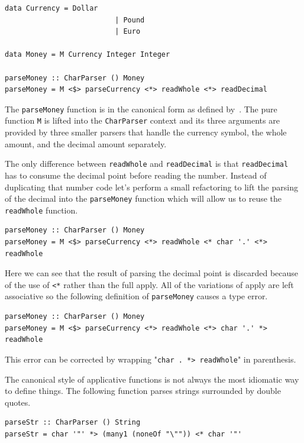 \begin{lstlisting}[frame=tblr]
 data Currency = Dollar
                          | Pound
                          | Euro
              
data Money = M Currency Integer Integer

parseMoney :: CharParser () Money
parseMoney = M <$> parseCurrency <*> readWhole <*> readDecimal
 \end{lstlisting}
 
The \texttt{parseMoney} function is in the canonical form as defined by~\cite{mcbrideIdioms}. The pure function \texttt{M} is lifted into the \texttt{CharParser} context and its three arguments are provided by three smaller parsers that handle the currency symbol, the whole amount, and the decimal amount separately. 

The only difference between \texttt{readWhole} and \texttt{readDecimal} is that \texttt{readDecimal} has to consume the decimal point before reading the number. Instead of duplicating that number code let's perform a small refactoring to lift the parsing of the decimal into the \texttt{parseMoney} function which will allow us to reuse the \texttt{readWhole} function.

 \begin{lstlisting}[frame=tblr]
parseMoney :: CharParser () Money
parseMoney = M <$> parseCurrency <*> readWhole <* char '.' <*> readWhole
 \end{lstlisting}
 
 Here we can see that the result of parsing the decimal point is discarded because of the use of \texttt{<*} rather than the full apply. All of the variations of apply are left associative so the following definition of \texttt{parseMoney} causes a type error.
 
  \begin{lstlisting}[frame=tblr]
parseMoney :: CharParser () Money
parseMoney = M <$> parseCurrency <*> readWhole <*> char '.' *> readWhole
 \end{lstlisting}
 
This error can be corrected by wrapping "\texttt{char \textquotesingle.\textquotesingle~*> readWhole}" in parenthesis. 
 
The canonical style of applicative functions is not always the most idiomatic way to define things. The following function parses strings surrounded by double quotes.

\begin{lstlisting}[frame=tblr]
parseStr :: CharParser () String 
parseStr = char '"' *> (many1 (noneOf "\"")) <* char '"'
\end{lstlisting}

